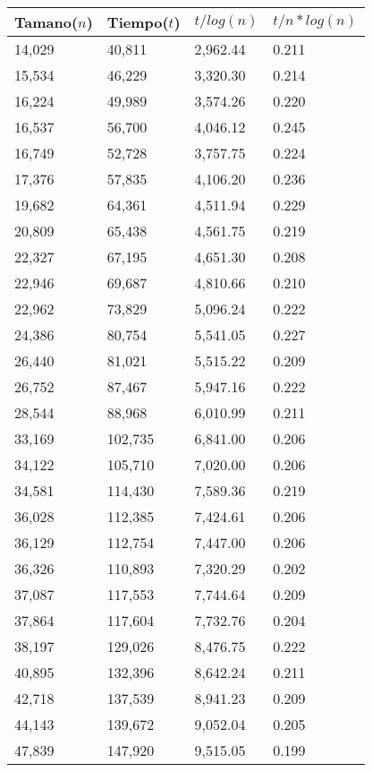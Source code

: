 \begin{table}[H]
\parbox{0.3\textwidth}{
  \begin{tabular}{| l | l | l |l |}
    \hline
    Tamano($n$) & Tiempo($t$) & $t / log(n)$ & $t / n*log(n)$ \\ \hline
14,029	&	40,811	&	2,962.44	&	0.211	\\ \hline
15,534	&	46,229	&	3,320.30	&	0.214	\\ \hline
16,224	&	49,989	&	3,574.26	&	0.220	\\ \hline
16,537	&	56,700	&	4,046.12	&	0.245	\\ \hline
16,749	&	52,728	&	3,757.75	&	0.224	\\ \hline
17,376	&	57,835	&	4,106.20	&	0.236	\\ \hline
19,682	&	64,361	&	4,511.94	&	0.229	\\ \hline
20,809	&	65,438	&	4,561.75	&	0.219	\\ \hline
22,327	&	67,195	&	4,651.30	&	0.208	\\ \hline
22,946	&	69,687	&	4,810.66	&	0.210	\\ \hline
22,962	&	73,829	&	5,096.24	&	0.222	\\ \hline
24,386	&	80,754	&	5,541.05	&	0.227	\\ \hline
26,440	&	81,021	&	5,515.22	&	0.209	\\ \hline
26,752	&	87,467	&	5,947.16	&	0.222	\\ \hline
28,544	&	88,968	&	6,010.99	&	0.211	\\ \hline
33,169	&	102,735	&	6,841.00	&	0.206	\\ \hline
34,122	&	105,710	&	7,020.00	&	0.206	\\ \hline
34,581	&	114,430	&	7,589.36	&	0.219	\\ \hline
36,028	&	112,385	&	7,424.61	&	0.206	\\ \hline
36,129	&	112,754	&	7,447.00	&	0.206	\\ \hline
36,326	&	110,893	&	7,320.29	&	0.202	\\ \hline
37,087	&	117,553	&	7,744.64	&	0.209	\\ \hline
37,864	&	117,604	&	7,732.76	&	0.204	\\ \hline
38,197	&	129,026	&	8,476.75	&	0.222	\\ \hline
40,895	&	132,396	&	8,642.24	&	0.211	\\ \hline
42,718	&	137,539	&	8,941.23	&	0.209	\\ \hline
44,143	&	139,672	&	9,052.04	&	0.205	\\ \hline
47,839	&	147,920	&	9,515.05	&	0.199	\\ \hline

\end{tabular}}
\end{table}
